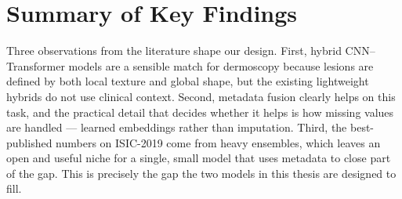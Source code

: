 \section{Summary of Key Findings}

Three observations from the literature shape our design. First, hybrid
CNN--Transformer models are a sensible match for dermoscopy because lesions are
defined by both local texture and global shape, but the existing lightweight
hybrids do not use clinical context. Second, metadata fusion clearly helps on
this task, and the practical detail that decides whether it helps is how
missing values are handled --- learned embeddings rather than imputation. Third,
the best-published numbers on ISIC-2019 come from heavy ensembles, which leaves
an open and useful niche for a single, small model that uses metadata to close
part of the gap. This is precisely the gap the two models in this thesis are
designed to fill.
